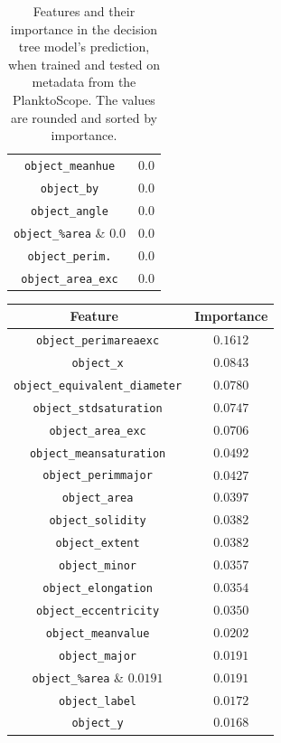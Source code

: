 \begin{table}[h!]
\begin{tabular}{cc}
        \verb|object_meanhue| & $0.0$ \\
        \verb|object_by| & $0.0$ \\
        \verb|object_angle| & $0.0$ \\
        \verb|object_%area| & $0.0$ \\
        \verb|object_perim.| & $0.0$ \\
        \verb|object_area_exc| & $0.0$ \\
        \hline
    \end{tabular}
    \caption{Features and their importance in the decision tree model's prediction, when trained and tested on metadata from the PlanktoScope. The values are rounded and sorted by importance.}
    \label{tab:dt_ft_imp}
\end{table}

\begin{table}[h!]
    \centering
    \begin{tabular}{cc}
        \hline
        Feature \, & Importance \\
        \hline 
        \verb|object_perimareaexc| & $0.1612$ \\
        \verb|object_x| & $0.0843$ \\
        \verb|object_equivalent_diameter| & $0.0780$ \\
        \verb|object_stdsaturation| & $0.0747$ \\
        \verb|object_area_exc| & $0.0706$ \\
        \verb|object_meansaturation| & $0.0492$ \\
        \verb|object_perimmajor| & $0.0427$ \\
        \verb|object_area| & $0.0397$ \\
        \verb|object_solidity| & $0.0382$ \\
        \verb|object_extent| & $0.0382$ \\
        \verb|object_minor| & $0.0357$ \\
        \verb|object_elongation| & $0.0354$ \\
        \verb|object_eccentricity| & $0.0350$ \\
        \verb|object_meanvalue| & $0.0202$ \\
        \verb|object_major| & $0.0191$ \\
        \verb|object_%area| & $0.0191$ \\
        \verb|object_label| & $0.0172$ \\
        \verb|object_y| & $0.0168$ \\

\end{tabular}
\end{table}
